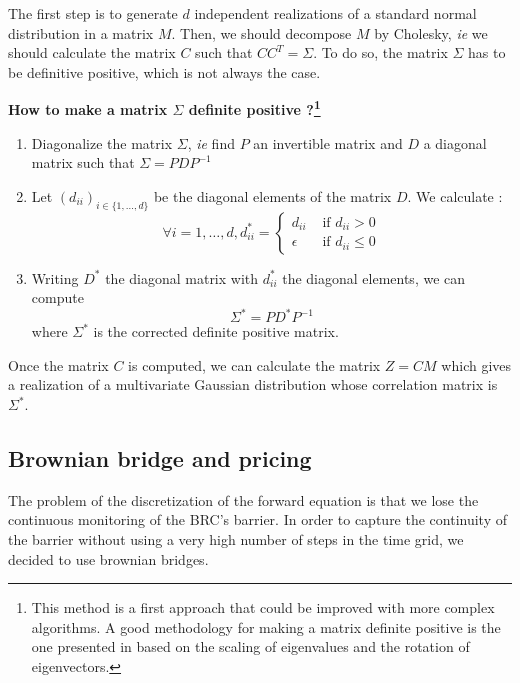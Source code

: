 \documentclass[a4paper,11pt,english]{book}
\begin{document}
The first step is to generate $d$ independent realizations of a standard normal distribution in a matrix $M$. Then, we should decompose $M$ by Cholesky, \textit{ie} we should calculate the matrix $C$ such that $CC^{T}=\Sigma$. To do so, the matrix $\Sigma$ has to be definitive positive, which is not always the case. \\

\begin{tcolorbox}[breakable,colback=cyan,opacityfill=0.05,colframe=blue,width=\dimexpr\textwidth+12mm\relax,enlarge left by=-6mm]
\begin{center}
\vspace{0.2cm}
\textbf{How to make a matrix $\Sigma$ definite positive ?\footnote{This method is a first approach that could be improved with more complex algorithms. A good methodology for making a matrix definite positive is the one presented in \cite{jung2015scaling} based on the scaling of eigenvalues and the rotation of eigenvectors.}}
\end{center}
\begin{enumerate}
    \item Diagonalize the matrix $\Sigma$, \textit{ie} find $P$ an invertible matrix and $D$ a diagonal matrix such that $\Sigma=PDP^{-1}$
    \item Let $(d_{ii})_{i \in \{1,\ldots,d\}}$ be the diagonal elements of the matrix $D$. We calculate : $$\forall i=1,\ldots,d, d_{ii}^{*}=\begin{cases}
        d_{ii}& \text{ if } d_{ii}>0 \\
        \epsilon& \text{ if } d_{ii}\leq0
    \end{cases}$$
 \item Writing $D^{*}$ the diagonal matrix with $d_{ii}^{*}$ the diagonal elements, we can compute $$\Sigma^{*}=PD^{*}P^{-1}$$ where $\Sigma^{*}$ is the corrected definite positive matrix.
\end{enumerate}
\end{tcolorbox}
Once the matrix $C$ is computed, we can calculate the matrix $Z=CM$ which gives a realization of a multivariate Gaussian distribution whose correlation matrix is $\Sigma^*$.
\subsection{Brownian bridge and pricing}
\label{subsec:brownian-bridge}
The problem of the discretization of the forward equation is that we lose the continuous monitoring of the BRC's barrier. In order to capture the continuity of the barrier without using a very high number of steps in the time grid, we decided to use brownian bridges.\\
\end{document}

